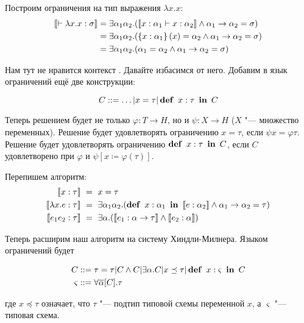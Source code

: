 \begin{example} Построим ограничения на тип выражения $\lambda x . x$:
    \begin{align*}
        \llbracket\vdash \lambda x . x : \sigma\rrbracket
        &= \exists \alpha_1 \alpha_2. (\llbracket x : \alpha_1 \vdash x : \alpha_2\rrbracket \land \alpha_1\to\alpha_2 = \sigma) \\
        &= \exists \alpha_1 \alpha_2. (\left\{x : \alpha_1\right\}(x) = \alpha_2 \land \alpha_1\to\alpha_2 = \sigma) \\
        &= \exists \alpha_1 \alpha_2. (\alpha_1 = \alpha_2 \land \alpha_1\to\alpha_2 = \sigma)
    \end{align*}
\end{example}

Нам тут не нравится контекст \todo. Давайте избасимся от него.
Добавим в язык ограничений ещё две конструкции:
\begin{bnf}
\[
    C ::= \ldots | x = \tau | \mathinner\mathbf{def}~x : \tau~\mathinner\mathbf{in}~C
\]
\end{bnf}%
Теперь решением будет не только $\varphi : T \to H$, но и $\psi : X \to H$ ($X$ "--- множество переменных).
Решение будет удовлетворять ограничению $x = \tau$, если $\psi x = \varphi \tau$.
Решение будет удовлетворять ограничению $\mathinner\mathbf{def}~x:\tau~\mathinner\mathbf{in}~C$, если $C$ удовлетворено при $\varphi$ и $\psi[x \coloneqq \varphi(\tau)]$.

Перепишем алгоритм:
\begin{align*}
    \restr{x : \tau} \ &=\  x = \tau \\
    \restr{\lambda x . e : \tau} \ &=\ 
        \exists \alpha_1 \alpha_2 . (\deff{x : \alpha_1}{\restr{e:\alpha_2}} \land \alpha_1\to\alpha_2=\tau) \\
    \restr{e_1 e_2 : \tau} \ &=\ 
        \exists\alpha.(\restr{e_1 :\alpha\to\tau} \land \restr{e_2 : \alpha})
\end{align*}

Теперь расширим наш алгоритм на систему Хиндли-Милнера. Языком ограничений будет
\begin{bnf}
\begin{align*}
    C &::= \tau = \tau | C \land C | \exists \alpha . C | x \preceq \tau | \mathinner\mathbf{def}~x : \varsigma~\mathinner\mathbf{in}~C \\
    \varsigma &::= \forall \overline\alpha[C] . \tau
\end{align*}
\end{bnf}%
где $x \preceq \tau$ означает, что $\tau$ "--- подтип типовой схемы переменной $x$, а $\varsigma$ "--- типовая схема.

